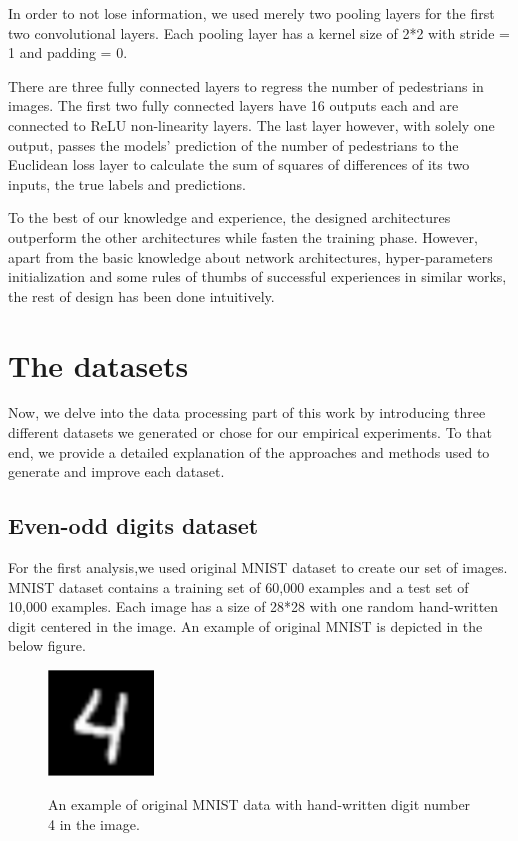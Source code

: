 \indent In order to not lose information, we used merely two pooling layers for the first two convolutional layers. Each pooling layer has a kernel size of 2*2 with stride = 1 and padding = 0. 

There are three fully connected layers to regress the number of pedestrians in images. The first two fully connected layers have 16 outputs each and are connected to ReLU non-linearity layers. The last layer however, with solely one output, passes the models' prediction of the number of pedestrians to the Euclidean loss layer to calculate the sum of squares of differences of its two inputs, the true labels and predictions.  

To the best of our knowledge and experience, the designed architectures outperform the other architectures while fasten the training phase. However, apart from the basic knowledge about network architectures, hyper-parameters initialization and some rules of thumbs of successful experiences in similar works, the rest of design has been done intuitively.

\section{The datasets}

Now, we delve into the data processing part of this work by introducing three different datasets we generated or chose for our empirical experiments. To that end, we provide a detailed explanation of the approaches and methods used to generate and improve each dataset.

\subsection{Even-odd digits dataset}
\label{subsubsec:digit}
For the first analysis,we used original MNIST dataset \cite{lecun1998mnist} to create our set of images. MNIST dataset contains a training set of 60,000 examples and a test set of 10,000 examples. Each image has a size of 28*28 with one random hand-written digit centered in the image. 
An example of original MNIST is depicted in the below figure.

\begin{figure}[H]
	\centering
	{\includegraphics[width=0.25\textwidth]{images/mnist}}
		\caption{An example of original MNIST data with hand-written digit number 4 in the image. }
	\label{fig:mnist}
\end{figure}


